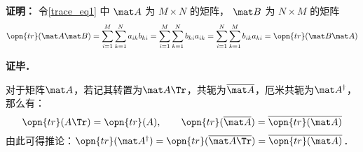 \textbf{证明：}
令\autoref{trace_eq1} 中 $\mat A$ 为 $M\times N$ 的矩阵， $\mat B$ 为 $N\times M$ 的矩阵
\begin{equation}
\opn{tr}(\mat A\mat B) = \sum_{i=1}^M \sum_{k=1}^N a_{ik}b_{ki} = \sum_{i=1}^M \sum_{k=1}^N b_{ki}a_{ik} = \sum_{i=1}^N \sum_{k=1}^M b_{ik}a_{ki} = \opn{tr}(\mat B\mat A)
\end{equation}

\textbf{证毕．}

\begin{exercise}{}\label{trace_exe1}
对于矩阵$\mat A$，若记其转置为$\mat A\Tr$，共轭为$\overline{\mat A}$，厄米共轭为$\mat A^\dagger$，那么有：
\begin{equation}
\opn{tr}(A\Tr)=\opn{tr}(A), \qquad \opn{tr}(\overline{\mat A})=\overline{\opn{tr}(\mat A)}
\end{equation}
由此可得推论：$\opn{tr}(\mat A^\dagger)=\opn{tr}(\overline{\mat A\Tr})=\overline{\opn{tr}(\mat A)}$．
\end{exercise}


